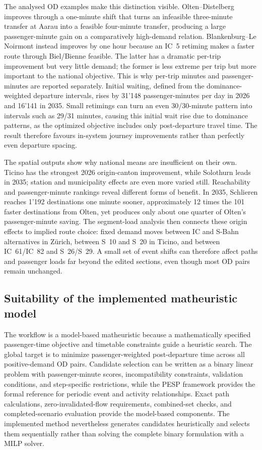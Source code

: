 \documentclass[preprint,12pt]{elsarticle}
\begin{document}
The analysed OD examples make this distinction visible. Olten--Distelberg improves through a one-minute shift that turns an infeasible three-minute transfer at Aarau into a feasible four-minute transfer, producing a large passenger-minute gain on a comparatively high-demand relation. Blankenburg--Le Noirmont instead improves by one hour because an IC~5 retiming makes a faster route through Biel/Bienne feasible. The latter has a dramatic per-trip improvement but very little demand; the former is less extreme per trip but more important to the national objective. This is why per-trip minutes and passenger-minutes are reported separately. Initial waiting, defined from the dominance-weighted departure intervals, rises by 31'148 passenger-minutes per day in 2026 and 16'141 in 2035. Small retimings can turn an even 30/30-minute pattern into intervals such as 29/31 minutes, causing this initial wait rise due to dominance patterns, as the optimized objective includes only post-departure travel time. The result therefore favours in-system journey improvements rather than perfectly even departure spacing.

The spatial outputs show why national means are insufficient on their own. Ticino has the strongest 2026 origin-canton improvement, while Solothurn leads in 2035; station and municipality effects are even more varied still. Reachability and passenger-minute rankings reveal different forms of benefit. In 2035, Schlieren reaches 1'192 destinations one minute sooner, approximately 12 times the 101 faster destinations from Olten, yet produces only about one quarter of Olten's passenger-minute saving. The segment-load analysis then connects these origin effects to implied route choice: fixed demand moves between IC and S-Bahn alternatives in Zürich, between S~10 and S~20 in Ticino, and between IC~61/IC~82 and S~26/S~29. A small set of event shifts can therefore affect paths and passenger loads far beyond the edited sections, even though most OD pairs remain unchanged.

\subsection{Suitability of the implemented matheuristic model}\label{sec:discussion-part2-matheuristic}

The workflow is a model-based matheuristic because a mathematically specified passenger-time objective and timetable constraints guide a heuristic search. The global target is to minimize passenger-weighted post-departure time across all positive-demand OD pairs. Candidate selection can be written as a binary linear problem with passenger-minute scores, incompatibility constraints, validation conditions, and step-specific restrictions, while the PESP framework provides the formal reference for periodic event and activity relationships. Exact path calculations, zero-invalidated-flow requirements, combined-set checks, and completed-scenario evaluation provide the model-based components. The implemented method nevertheless generates candidates heuristically and selects them sequentially rather than solving the complete binary formulation with a MILP solver.
\end{document}
